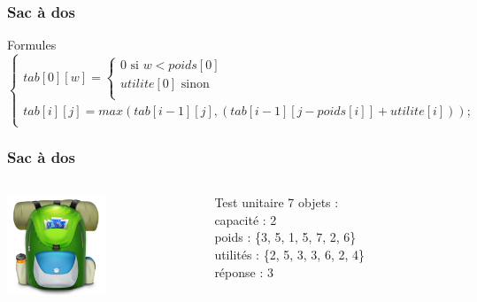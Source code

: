 \documentclass[french]{beamer}
\begin{document}
  
  \begin{frame}
    \frametitle{Sac à dos}
    \begin{alertblock}{Formules}
      \begin{equation}
        \begin{cases}
          tab[0][w] = 
          \begin{cases} 
            \text{0 si } w < poids[0] \\
            utilite[0] \text{ sinon} \\
          \end{cases} \\

          tab[i][j] = max(tab[i-1] [j], (tab[i-1] [j-poids[i]] + utilite[i])); \\
        \end{cases}
      \end{equation}
    \end{alertblock}
  \end{frame}

\begin{frame}
  \frametitle{Sac à dos}
  \begin{columns}
    \begin{column}[]{3cm}
      \begin{center}
        \includegraphics[height=3cm]{../images/Knapsack.png}
      \end{center}
    \end{column}
      \begin{column}[]{7cm}
        \begin{block}{Test unitaire}
		7 objets : \\
		capacité : 2\\
		poids : \{3, 5, 1, 5, 7, 2, 6\} \\
		utilités : \{2, 5, 3, 3, 6, 2, 4\} \\
		réponse : 3 \\
        \end{block}
      \end{column}
    \end{columns}
  \end{frame}
\end{document}
